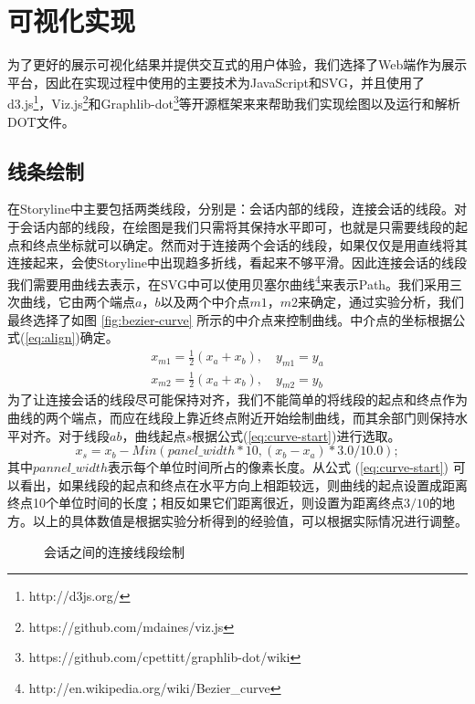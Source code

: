 \section{可视化实现}
为了更好的展示可视化结果并提供交互式的用户体验，我们选择了Web端作为展示平台，因此在实现过程中使用的主要技术为JavaScript和SVG，并且使用了d3.js\footnote{http://d3js.org/}，Viz.js\footnote{https://github.com/mdaines/viz.js}和Graphlib-dot\footnote{https://github.com/cpettitt/graphlib-dot/wiki}等开源框架来来帮助我们实现绘图以及运行和解析DOT文件。
\subsection*{线条绘制}
在Storyline中主要包括两类线段，分别是：会话内部的线段，连接会话的线段。对于会话内部的线段，在绘图是我们只需将其保持水平即可，也就是只需要线段的起点和终点坐标就可以确定。然而对于连接两个会话的线段，如果仅仅是用直线将其连接起来，会使Storyline中出现趋多折线，看起来不够平滑。因此连接会话的线段我们需要用曲线去表示，在SVG中可以使用贝塞尔曲线\footnote{http://en.wikipedia.org/wiki/Bezier\_curve}来表示Path。我们采用三次曲线，它由两个端点$a$，$b$以及两个中介点$m1$，$m2$来确定，通过实验分析，我们最终选择了如图 \ref{fig:bezier-curve} 所示的中介点来控制曲线。中介点的坐标根据公式(\ref{eq:align})确定。
\begin{subequations}
\label{eq:align}
\begin{align}
    x_{m1} = \frac{1}{2}\left ( x_a + x_b \right ), \quad y_{m1} = y_a \\
    x_{m2} = \frac{1}{2}\left ( x_a + x_b \right ), \quad y_{m2} = y_b
\end{align}
\end{subequations}
为了让连接会话的线段尽可能保持对齐，我们不能简单的将线段的起点和终点作为曲线的两个端点，而应在线段上靠近终点附近开始绘制曲线，而其余部门则保持水平对齐。对于线段$ab$，曲线起点$s$根据公式(\ref{eq:curve-start})进行选取。
\begin{equation}
\label{eq:curve-start}
x_s = x_b - Min(panel\_width*10, (x_b - x_a)*3.0/10.0);
\end{equation}
其中$pannel\_width$表示每个单位时间所占的像素长度。从公式 (\ref{eq:curve-start}) 可以看出，如果线段的起点和终点在水平方向上相距较远，则曲线的起点设置成距离终点10个单位时间的长度；相反如果它们距离很近，则设置为距离终点$3/10$的地方。以上的具体数值是根据实验分析得到的经验值，可以根据实际情况进行调整。
\begin{figure}[htb]
    \centering
    \caption{会话之间的连接线段绘制}
    \label{fig:session-space}
\end{figure}

